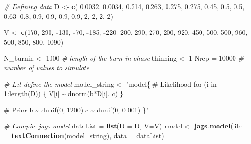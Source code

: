 \documentclass[
]{article}
\newenvironment{Shaded}{\begin{snugshade}}{\end{snugshade}}
\newcommand{\AttributeTok}[1]{\textcolor[rgb]{0.13,0.29,0.53}{#1}}
\newcommand{\CommentTok}[1]{\textcolor[rgb]{0.56,0.35,0.01}{\textit{#1}}}
\newcommand{\DecValTok}[1]{\textcolor[rgb]{0.00,0.00,0.81}{#1}}
\newcommand{\FloatTok}[1]{\textcolor[rgb]{0.00,0.00,0.81}{#1}}
\newcommand{\FunctionTok}[1]{\textcolor[rgb]{0.13,0.29,0.53}{\textbf{#1}}}
\newcommand{\NormalTok}[1]{#1}
\newcommand{\OtherTok}[1]{\textcolor[rgb]{0.56,0.35,0.01}{#1}}
\newcommand{\SpecialCharTok}[1]{\textcolor[rgb]{0.81,0.36,0.00}{\textbf{#1}}}
\newcommand{\StringTok}[1]{\textcolor[rgb]{0.31,0.60,0.02}{#1}}
\begin{document}
\begin{Shaded}
\begin{Highlighting}[]
\CommentTok{\# Defining data}
\NormalTok{D }\OtherTok{\textless{}{-}} \FunctionTok{c}\NormalTok{( }\FloatTok{0.0032}\NormalTok{, }\FloatTok{0.0034}\NormalTok{, }\FloatTok{0.214}\NormalTok{,  }\FloatTok{0.263}\NormalTok{,  }\FloatTok{0.275}\NormalTok{,  }\FloatTok{0.275}\NormalTok{,  }\FloatTok{0.45}\NormalTok{,   }\FloatTok{0.5}\NormalTok{,    }\FloatTok{0.5}\NormalTok{,    }\FloatTok{0.63}\NormalTok{,   }\FloatTok{0.8}\NormalTok{,    }\FloatTok{0.9}\NormalTok{,    }\FloatTok{0.9}\NormalTok{,    }\FloatTok{0.9}\NormalTok{,    }\FloatTok{0.9}\NormalTok{,    }\DecValTok{2}\NormalTok{,  }\DecValTok{2}\NormalTok{,  }\DecValTok{2}\NormalTok{,  }\DecValTok{2}\NormalTok{)}

\NormalTok{V }\OtherTok{\textless{}{-}} \FunctionTok{c}\NormalTok{(}\DecValTok{170}\NormalTok{, }\DecValTok{290}\NormalTok{,    }\SpecialCharTok{{-}}\DecValTok{130}\NormalTok{,   }\SpecialCharTok{{-}}\DecValTok{70}\NormalTok{,    }\SpecialCharTok{{-}}\DecValTok{185}\NormalTok{,   }\SpecialCharTok{{-}}\DecValTok{220}\NormalTok{,   }\DecValTok{200}\NormalTok{,    }\DecValTok{290}\NormalTok{,    }\DecValTok{270}\NormalTok{,    }\DecValTok{200}\NormalTok{,    }\DecValTok{920}\NormalTok{,    }\DecValTok{450}\NormalTok{,    }\DecValTok{500}\NormalTok{,    }\DecValTok{500}\NormalTok{,    }\DecValTok{960}\NormalTok{,    }\DecValTok{500}\NormalTok{,    }\DecValTok{850}\NormalTok{,    }\DecValTok{800}\NormalTok{,    }\DecValTok{1090}\NormalTok{)}

\NormalTok{N\_burnin }\OtherTok{\textless{}{-}} \DecValTok{1000} \CommentTok{\# length of the burn{-}in phase }
\NormalTok{thinning }\OtherTok{\textless{}{-}} \DecValTok{1}
\NormalTok{Nrep }\OtherTok{=} \DecValTok{10000}     \CommentTok{\# number of values to simulate}

\CommentTok{\# Let\textquotesingle{} define the model}
\NormalTok{model\_string }\OtherTok{\textless{}{-}} \StringTok{"model\{}
\StringTok{  }
\StringTok{  \# Likelihood}
\StringTok{  for (i in 1:length(D)) \{}
\StringTok{    V[i] \textasciitilde{} dnorm(b*D[i], c)}
\StringTok{  \}}

\StringTok{  \# Prior}
\StringTok{  b \textasciitilde{} dunif(0, 1200)}
\StringTok{  c \textasciitilde{} dunif(0, 0.001)}
\StringTok{  }
\StringTok{\}"}

\CommentTok{\# Compile jags model}
\NormalTok{dataList }\OtherTok{=} \FunctionTok{list}\NormalTok{(}\AttributeTok{D =}\NormalTok{ D, }\AttributeTok{V=}\NormalTok{V)}
\NormalTok{model }\OtherTok{\textless{}{-}} \FunctionTok{jags.model}\NormalTok{(}\AttributeTok{file =} \FunctionTok{textConnection}\NormalTok{(model\_string), }
                    \AttributeTok{data =}\NormalTok{ dataList)}
\end{Highlighting}
\end{Shaded}
\end{document}
